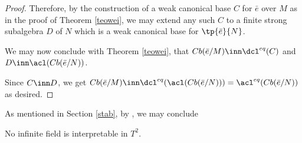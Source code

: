 \begin{proof}
Therefore, by the construction of a weak canonical base $C$ for %
$\bar e$ over $M$ as in the proof of Theorem \ref{teowei},
we may extend any such $C$ to a finite strong subalgebra $D$ of $N$ which is a weak canonical base for $\tp{\bar e}{N}$.

%

We may now conclude with Theorem \ref{teowei}, that
$Cb(\bar e/M)\inn\dcl^{eq}(C)$ and $D\inn\acl(Cb(\bar e/N))$.

%
%
%
Since $C\inn D$, we get $Cb(\bar e/M)\inn\dcl^{eq}(\acl(Cb(\bar e/N)))=\acl^{eq}(Cb(\bar e/N))$ as desired.
\end{proof}

As mentioned in Section \ref{stab}, by \cite[Proposition 3.2]{pilcm}, we may conclude
\begin{cor}
No infinite field is interpretable in $T^{2}$.
\end{cor}
